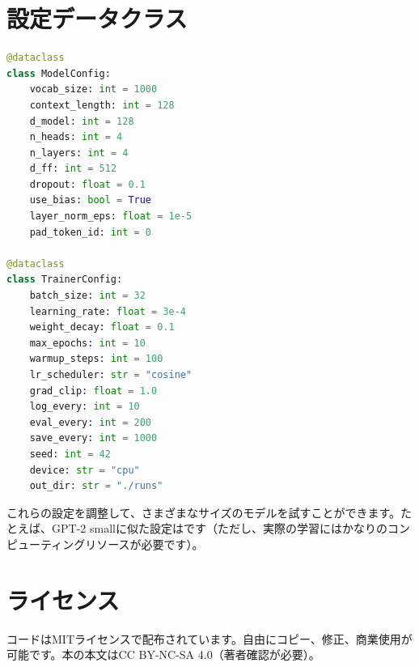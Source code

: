 \section{設定データクラス}

\begin{lstlisting}[language=Python]
@dataclass
class ModelConfig:
    vocab_size: int = 1000
    context_length: int = 128
    d_model: int = 128
    n_heads: int = 4
    n_layers: int = 4
    d_ff: int = 512
    dropout: float = 0.1
    use_bias: bool = True
    layer_norm_eps: float = 1e-5
    pad_token_id: int = 0

@dataclass
class TrainerConfig:
    batch_size: int = 32
    learning_rate: float = 3e-4
    weight_decay: float = 0.1
    max_epochs: int = 10
    warmup_steps: int = 100
    lr_scheduler: str = "cosine"
    grad_clip: float = 1.0
    log_every: int = 10
    eval_every: int = 200
    save_every: int = 1000
    seed: int = 42
    device: str = "cpu"
    out_dir: str = "./runs"
\end{lstlisting}

これらの設定を調整して、さまざまなサイズのモデルを試すことができます。たとえば、GPT-2 smallに似た設定はです（ただし、実際の学習にはかなりのコンピューティングリソースが必要です）。

\section{ライセンス}

コードはMITライセンスで配布されています。自由にコピー、修正、商業使用が可能です。本の本文はCC BY-NC-SA 4.0（著者確認が必要）。
